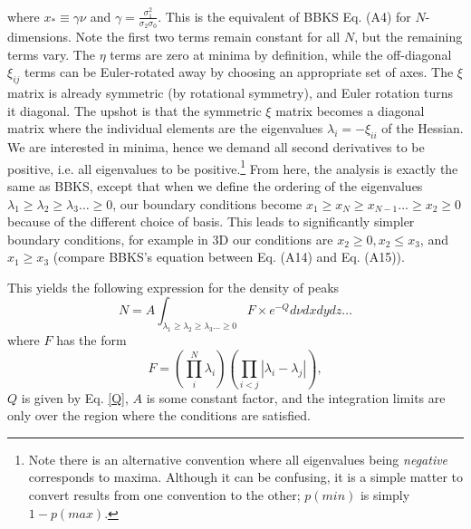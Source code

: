 \documentclass[12pt]{article}
\begin{document}
\noindent where $x_* \equiv \gamma \nu$ and $\gamma = \frac{\sigma_1^2}{\sigma_2 \sigma_0}$. This is the equivalent of BBKS Eq. (A4) for $N$-dimensions. Note the first two terms remain constant for all $N$, but the remaining terms vary. The $\eta$ terms are zero at minima by definition, while the off-diagonal $\xi_{ij}$ terms can be Euler-rotated away by choosing an appropriate set of axes. The $\xi$ matrix is already symmetric (by rotational symmetry), and Euler rotation turns it diagonal.\cite{Goldstein} The upshot is that the symmetric $\xi$ matrix becomes a diagonal matrix where the individual elements are the eigenvalues $\lambda_i = -\xi_{ii}$ of the Hessian. We are interested in minima, hence we demand all second derivatives to be positive, i.e. all eigenvalues to be positive.\footnote{Note there is an alternative convention where all eigenvalues being \emph{negative} corresponds to maxima. Although it can be confusing, it is a simple matter to convert results from one convention to the other; $p(min)$ is simply $1-p(max)$.} From here, the analysis is exactly the same as BBKS, except that when we define the ordering of the eigenvalues $\lambda_1 \geq \lambda_2 \geq \lambda_3 \ldots \geq 0$, our boundary conditions become $x_1\geq x_N\geq x_{N-1} ... \geq x_2 \geq 0$ because of the different choice of basis. This leads to significantly simpler boundary conditions, for example in 3D our conditions are $x_2 \geq 0, x_2 \leq x_3$, and $x_1 \geq x_3$ (compare BBKS's equation between Eq. (A14) and Eq. (A15)).

This yields the following expression for the density of peaks
%
\begin{equation} \label{DensityOfPeaks}
N = A \int_{\lambda_1 \geq \lambda_2 \geq \lambda_3 \ldots \geq 0} F \times e^{-Q} d\nu dx dy dz \ldots
\end{equation}
%
\noindent where $F$ has the form 
\begin{equation}
F = \left(\prod_{i}^{N} \lambda_i \right)\left(\prod_{i<j} |\lambda_i-\lambda_j|\right),
\end{equation} 
%
$Q$ is given by Eq. \ref{Q}, $A$ is some constant factor, and the integration limits are only over the region where the conditions are satisfied. 

\end{document}

